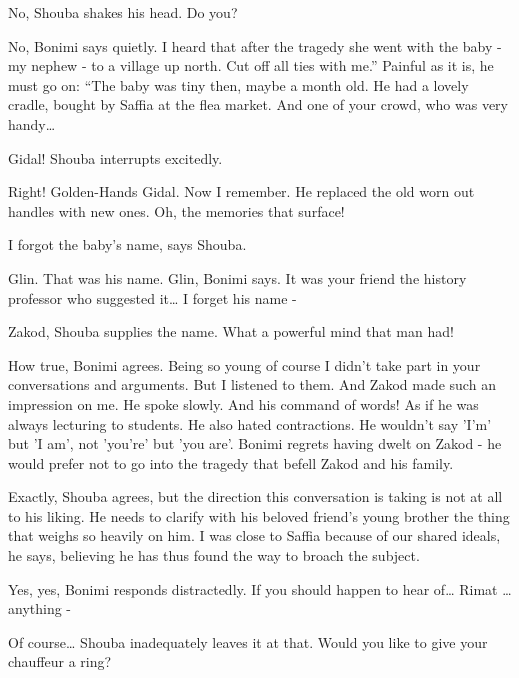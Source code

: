 \documentclass[12pt]{book}
\begin{document}
{\textquotedbl}No,{\textquotedbl} Shouba shakes his head. {\textquotedbl}Do you?{\textquotedbl}

{\textquotedbl}No,{\textquotedbl} Bonimi says quietly. {\textquotedbl}I heard that after the tragedy she went with the
baby - my nephew - to a village up north. Cut off all ties with me.'' Painful as it is, he must go on: ``The baby was
tiny then, maybe a month old. He had a lovely cradle, bought by Saffia at the flea market. And one of your crowd, who
was very handy{\dots}{\textquotedbl}

{\textquotedbl}Gidal!{\textquotedbl} Shouba interrupts excitedly.

{\textquotedbl}Right! Golden-Hands Gidal. Now I remember. He replaced the old worn out handles with new ones. Oh, the
memories that surface!{\textquotedbl}

{\textquotedbl}I forgot the baby's name,{\textquotedbl} says Shouba.

{\textquotedbl}Glin. That was his name. Glin,{\textquotedbl} Bonimi says. {\textquotedbl}It was your friend the history
professor who suggested it{\dots} I forget his name -{\textquotedbl}

{\textquotedbl}Zakod,{\textquotedbl} Shouba supplies the name. {\textquotedbl}What a powerful mind that man
had!{\textquotedbl}

{\textquotedbl}How true,{\textquotedbl} Bonimi agrees. {\textquotedbl}Being so young of course I didn't take part in
your conversations and arguments. But I listened to them. And Zakod made such an impression on me. He spoke slowly. And
his command of words! As if he was always lecturing to students. He also hated contractions. He wouldn't say 'I'm' but
'I am', not 'you're' but 'you are'.{\textquotedbl} Bonimi regrets having dwelt on Zakod - he would prefer not to go
into the tragedy that befell Zakod and his family.

{\textquotedbl}Exactly,{\textquotedbl} Shouba agrees, but the direction this conversation is taking is not at all to his
liking. He needs to clarify with his beloved friend's young brother the thing that weighs so heavily on him.
{\textquotedbl}I was close to Saffia because of our shared ideals,{\textquotedbl} he says, believing he has thus found
the way to broach the subject.

{\textquotedbl}Yes, yes,{\textquotedbl} Bonimi responds distractedly. {\textquotedbl}If you should happen to hear
of{\dots} Rimat {\dots} anything -{\textquotedbl}

{\textquotedbl}Of course{{\dots}}{\textquotedbl} Shouba inadequately leaves it
at that. {\textquotedbl}Would you like to give your chauffeur a ring?{\textquotedbl}
\end{document}
